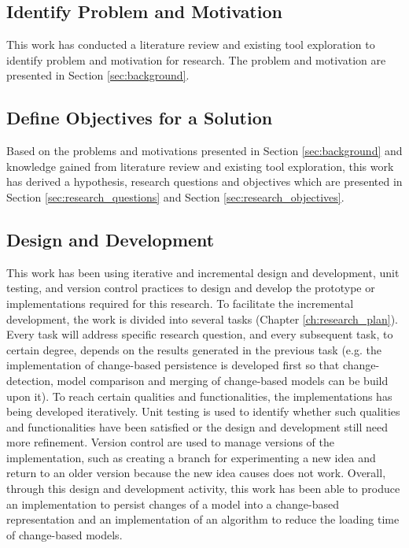 \documentclass[12pt, a4paper]{report} \usepackage[titletoc]{appendix}
\begin{document}
\subsection{Identify Problem and Motivation}
\label{subsec:identify_problem_and_motivation}
This work has conducted a literature review and existing tool exploration to identify problem and motivation for research. The problem and motivation are presented in Section \ref{sec:background}.

\subsection{Define Objectives for a Solution}
\label{subsec:define_objectives_for_a_solution}
Based on the problems and motivations presented in Section \ref{sec:background} and knowledge gained from literature review and existing tool exploration, this work has derived a hypothesis, research questions and objectives which are presented in Section \ref{sec:research_questions} and Section \ref{sec:research_objectives}. 

\subsection{Design and Development}
\label{subsec:design_and_development}
This work has been using iterative and incremental design and development, unit testing, and version control practices to design and develop the prototype or implementations required for this research. To facilitate the incremental development, the work is divided into several tasks (Chapter \ref{ch:research_plan}). Every task will address specific research question, and every subsequent task, to certain degree, depends on the results generated in the previous task (e.g. the implementation of change-based persistence is developed first so that change-detection, model comparison and merging of change-based models can be build upon it). To reach certain qualities and functionalities, the implementations has being developed iteratively. Unit testing is used to identify whether such qualities and functionalities have been satisfied or the design and development still need more refinement. Version control are used to manage versions of the implementation, such as creating a branch for experimenting a new idea and return to an older version because the new idea causes does not work. Overall, through this design and development activity, this work has been able to produce an implementation to persist changes of a model into a change-based representation and an implementation of an algorithm to reduce the loading time of change-based models.
\end{document}
